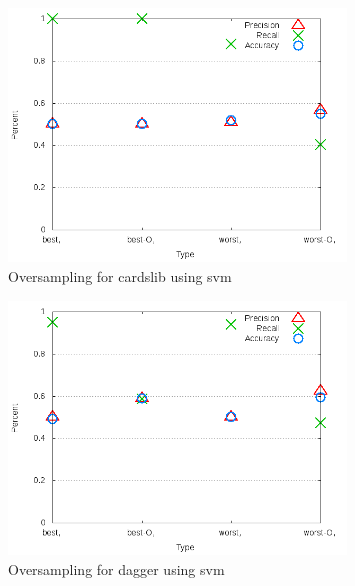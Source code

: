 \begin{figure}[!t]
\centering
\includegraphics[width=0.8\textwidth]{images/svm/test_4/cardslib_sample_range.png}
\caption{Oversampling for cardslib using \gls{svm}}
\label{fig:test_4_cardslib_svm}
\end{figure}

\begin{figure}[!t]
\centering
\includegraphics[width=0.8\textwidth]{images/svm/test_4/dagger_sample_range.png}
\caption{Oversampling for dagger using \gls{svm}}
\label{fig:test_4_dagger_svm}
\end{figure}

